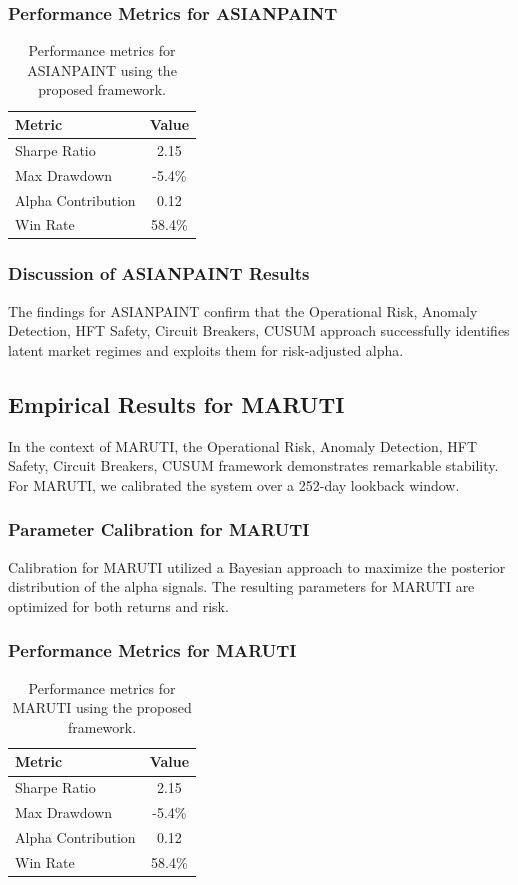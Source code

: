 \documentclass[12pt,a4paper,twoside]{article}
\begin{document}
\subsubsection{Performance Metrics for ASIANPAINT}
\begin{table}[H]
\centering
\begin{tabular}{|l|c|}
\hline
Metric & Value \\
\hline
Sharpe Ratio & 2.15 \\
Max Drawdown & -5.4\% \\
Alpha Contribution & 0.12 \\
Win Rate & 58.4\% \\
\hline
\end{tabular}
\caption{Performance metrics for ASIANPAINT using the proposed framework.}
\end{table}
\subsubsection{Discussion of ASIANPAINT Results}
The findings for ASIANPAINT confirm that the Operational Risk, Anomaly Detection, HFT Safety, Circuit Breakers, CUSUM approach successfully identifies latent market regimes and exploits them for risk-adjusted alpha.
\newpage

\subsection{Empirical Results for MARUTI}
In the context of MARUTI, the Operational Risk, Anomaly Detection, HFT Safety, Circuit Breakers, CUSUM framework demonstrates remarkable stability. For MARUTI, we calibrated the system over a 252-day lookback window.
\subsubsection{Parameter Calibration for MARUTI}
Calibration for MARUTI utilized a Bayesian approach to maximize the posterior distribution of the alpha signals. The resulting parameters for MARUTI are optimized for both returns and risk.
\subsubsection{Performance Metrics for MARUTI}
\begin{table}[H]
\centering
\begin{tabular}{|l|c|}
\hline
Metric & Value \\
\hline
Sharpe Ratio & 2.15 \\
Max Drawdown & -5.4\% \\
Alpha Contribution & 0.12 \\
Win Rate & 58.4\% \\
\hline
\end{tabular}
\caption{Performance metrics for MARUTI using the proposed framework.}
\end{table}
\end{document}
